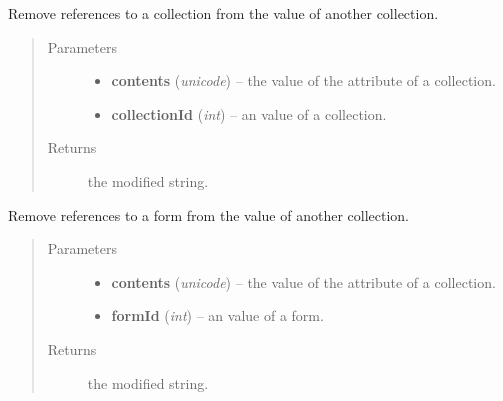 \documentclass[letterpaper,10pt,english]{sphinxmanual}
\begin{document}
\begin{fulllineitems}
\label{api:onlinelinguisticdatabase.controllers.oldcollections.removeReferencesToThisCollection}
Remove references to a collection from the  value of another collection.
\begin{quote}\begin{description}
\item[{Parameters}] \leavevmode\begin{itemize}
\item {} 
\textbf{contents} (\emph{unicode}) -- the value of the  attribute of a collection.

\item {} 
\textbf{collectionId} (\emph{int}) -- an  value of a collection.

\end{itemize}

\item[{Returns}] \leavevmode
the modified  string.

\end{description}\end{quote}

\end{fulllineitems}


\begin{fulllineitems}
\label{api:onlinelinguisticdatabase.controllers.oldcollections.removeReferencesToThisForm}
Remove references to a form from the  value of another collection.
\begin{quote}\begin{description}
\item[{Parameters}] \leavevmode\begin{itemize}
\item {} 
\textbf{contents} (\emph{unicode}) -- the value of the  attribute of a collection.

\item {} 
\textbf{formId} (\emph{int}) -- an  value of a form.

\end{itemize}

\item[{Returns}] \leavevmode
the modified  string.

\end{description}\end{quote}

\end{fulllineitems}
\end{document}
